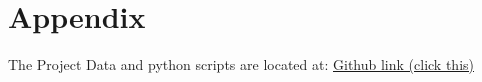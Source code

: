 \documentclass[12pt]{article}
\begin{document}






\newpage
\section*{Appendix}


The Project Data and python scripts are located at:
\href{https://github.com/ZHBALEX/Numerical-CFD/tree/60273759636072e50303ec2d617671364485c46e/.github/CFD\%20Projects/CFD_Final_Circular_Cylinder_Cross-Flow}{Github link (click this)}
\end{document}
